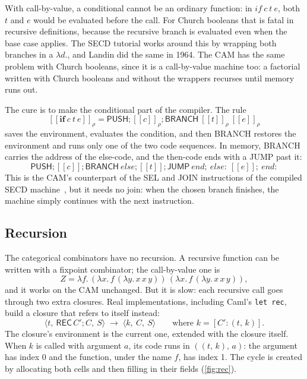 \documentclass[11pt,a4paper]{article}
\newcommand{\ins}[1]{\textsf{#1}}
\newcommand{\clo}[2]{[#1 : #2]}
\newcommand{\pr}[2]{(#1,\, #2)}
\newcommand{\sem}[1]{[\![#1]\!]}
\newcommand{\trans}{\;\longrightarrow\;}
\newcommand{\cs}[3]{\langle #1,\ #2,\ #3\rangle}
\newcommand{\seq}{\mathbin{;}}
\theoremstyle{definition}
\theoremstyle{plain}
\begin{document}
With call-by-value, a conditional cannot be an ordinary function: in
$\mathit{if}\ c\ t\ e$, both $t$ and $e$ would be evaluated before the call.
For Church booleans that is fatal in recursive definitions, because the
recursive branch is evaluated even when the base case applies. The SECD
tutorial works around this by wrapping both branches in a $\lambda d.$, and
Landin did the same in 1964. The CAM has the same problem with Church
booleans, since it is a call-by-value machine too: a factorial written with
Church booleans and without the wrappers recurses until memory runs out.

The cure is to make the conditional part of the compiler. The rule
\[
  \sem{\textbf{if}\ c\ t\ e}_\rho = \ins{PUSH}\seq \sem{c}_\rho\seq \ins{BRANCH}\ \sem{t}_\rho\ \sem{e}_\rho
\]
saves the environment, evaluates the condition, and then \ins{BRANCH} restores
the environment and runs only one of the two code sequences. In memory,
\ins{BRANCH} carries the address of the else-code, and the then-code ends
with a \ins{JUMP} past it:
\[
  \ins{PUSH}\seq \sem{c}\seq \ins{BRANCH}\ \mathit{else}\seq \sem{t}\seq
  \ins{JUMP}\ \mathit{end}\seq\ \mathit{else}{:}\ \sem{e}\seq\ \mathit{end}{:}
\]
This is the CAM's counterpart of the \ins{SEL} and \ins{JOIN} instructions of
the compiled SECD machine~\cite{henderson80}, but it needs no join: when the
chosen branch finishes, the machine simply continues with the next
instruction.

\subsection{Recursion}

The categorical combinators have no recursion. A recursive function can be
written with a fixpoint combinator; the call-by-value one is
\[
  Z = \lambda f.\,(\lambda x.\,f\,(\lambda y.\,x\,x\,y))\,(\lambda x.\,f\,(\lambda y.\,x\,x\,y)),
\]
and it works on the CAM unchanged. But it is slow: each recursive call goes
through two extra closures. Real implementations, including Caml's
\texttt{let rec}, build a closure that refers to itself instead:
\[
  \cs{t}{\ins{REC}\,C'\seq C}{S} \trans \cs{k}{C}{S}
  \qquad\text{where } k = \clo{C'}{\pr{t}{k}}.
\]
The closure's environment is the current one, extended with the closure
itself. When $k$ is called with argument $a$, its code runs in
$\pr{\pr{t}{k}}{a}$: the argument has index 0 and the function, under the name
$f$, has index 1. The cycle is created by allocating both cells and then
filling in their fields (\cref{fig:rec}).
\end{document}
